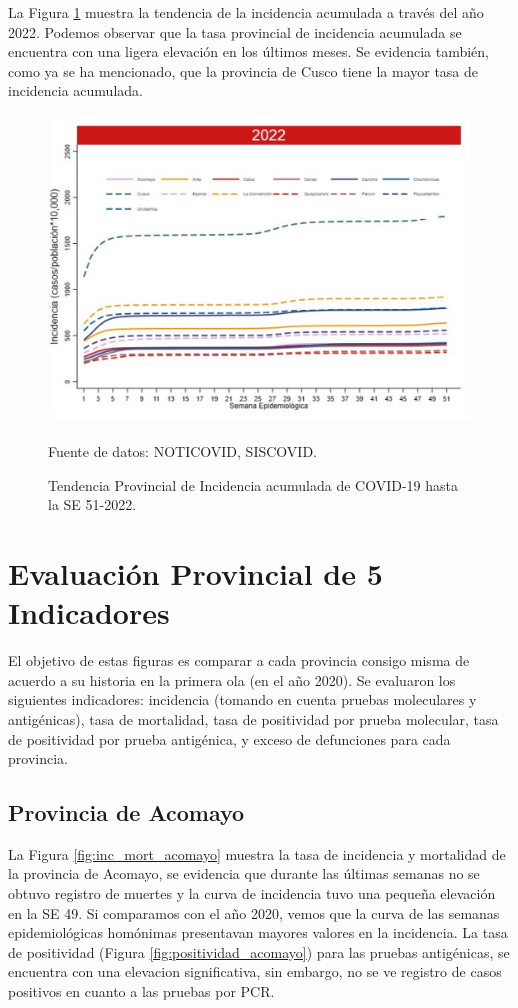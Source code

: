 \documentclass[12pt,a4paper,openany]{book}
\begin{document}
	La Figura \ref{fig:incidencia_provincial} muestra la tendencia de la incidencia acumulada a través del año 2022. Podemos observar que la tasa provincial de incidencia acumulada se encuentra con una ligera elevación en los últimos meses. Se evidencia también, como ya se ha mencionado, que la provincia de Cusco tiene la mayor tasa de incidencia acumulada.
	
	\begin{figure}[h]
		\caption{Tendencia Provincial de Incidencia acumulada de COVID-19 hasta la SE 51-2022. }\label{fig:incidencia_provincial}
		\begin{center}
			\includegraphics[width=0.60\linewidth]{../figuras/incidencia_provincial_acumulada_2022.pdf}
		\end{center}
		{\footnotesize {Fuente de datos: NOTICOVID, SISCOVID.}}
	\end{figure}
	
	\clearpage
	
	\section*{Evaluación Provincial de 5 Indicadores}
	\noindent El objetivo de estas figuras es comparar a cada provincia consigo misma de acuerdo a su historia en la primera ola (en el año 2020). Se evaluaron los siguientes indicadores: incidencia (tomando en cuenta pruebas moleculares y antigénicas), tasa de mortalidad, tasa de positividad por prueba molecular, tasa de positividad por prueba antigénica, y exceso de defunciones para cada provincia.
	
	\subsection*{Provincia de Acomayo}
	\noindent La Figura \ref{fig:inc_mort_acomayo} muestra la tasa de incidencia y mortalidad de la provincia de Acomayo, se evidencia que durante las últimas semanas no se obtuvo registro de muertes y la curva de incidencia tuvo una pequeña elevación en la SE 49. Si comparamos con el año 2020, vemos que la curva de las semanas epidemiológicas homónimas presentavan mayores valores en la incidencia. La tasa de positividad (Figura \ref{fig:positividad_acomayo}) para las pruebas antigénicas, se encuentra con una elevacion significativa, sin embargo, no se ve registro de casos positivos en cuanto a las pruebas por PCR. 
		
\end{document}
